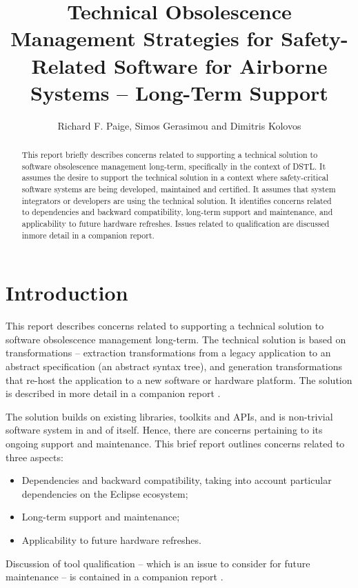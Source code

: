 \documentclass{llncs}
\begin{document}
\title{Technical Obsolescence Management Strategies for Safety-Related Software for Airborne Systems -- Long-Term Support}

\author{Richard F. Paige, Simos Gerasimou and Dimitris Kolovos}

\maketitle

\begin{abstract}
This report briefly describes concerns related to supporting a technical solution to software obsolescence management long-term,
specifically in the context of DSTL. It assumes the desire to support the technical solution in a context where safety-critical
software systems are being developed, maintained and certified. It assumes that system integrators or developers are using
the technical solution. It identifies concerns related to dependencies and backward compatibility, long-term support and
maintenance, and applicability to future hardware refreshes. Issues related to qualification are discussed inmore detail in a companion report.
\end{abstract}

\section{Introduction}

This report describes concerns related to supporting a technical solution to software obsolescence management long-term.
The technical solution is based on transformations -- extraction transformations from a legacy application to an abstract
specification (an abstract syntax tree), and generation transformations that re-host the application to a new software or
hardware platform. The solution is described in more detail in a companion report \cite{gerasimou17}.

The solution builds on existing libraries, toolkits and APIs, and is  non-trivial software system in and of
itself. Hence, there are concerns pertaining to its ongoing support and maintenance. This brief report outlines concerns related to three
aspects:
\begin{itemize}
\item Dependencies and backward compatibility, taking into account particular dependencies on the Eclipse ecosystem;
\item Long-term support and maintenance;
\item Applicability to future hardware refreshes.
\end{itemize}
Discussion of tool qualification -- which is an issue to consider for future maintenance -- is contained in a companion report \cite{paige17}.
\end{document}
